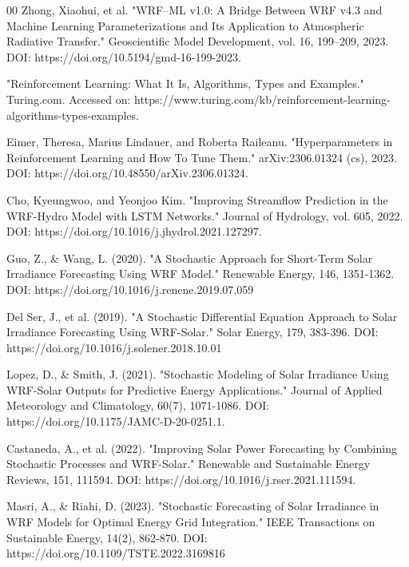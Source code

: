 \documentclass[conference]{IEEEtran}
\begin{document}
\begin{thebibliography}{00}
 Zhong, Xiaohui, et al. "WRF–ML v1.0: A Bridge Between WRF v4.3 and Machine Learning Parameterizations and Its Application to Atmospheric Radiative Transfer." Geoscientific Model Development, vol. 16, 199–209, 2023. DOI: https://doi.org/10.5194/gmd-16-199-2023.


 "Reinforcement Learning: What It Is, Algorithms, Types and Examples." Turing.com. Accessed on: https://www.turing.com/kb/reinforcement-learning-algorithms-types-examples.

 Eimer, Theresa, Marius Lindauer, and Roberta Raileanu. "Hyperparameters in Reinforcement Learning and How To Tune Them." arXiv:2306.01324 (cs), 2023. DOI: https://doi.org/10.48550/arXiv.2306.01324.

 Cho, Kyeungwoo, and Yeonjoo Kim. "Improving Streamflow Prediction in the WRF-Hydro Model with LSTM Networks." Journal of Hydrology, vol. 605, 2022. DOI: https://doi.org/10.1016/j.jhydrol.2021.127297.


 Guo, Z., \& Wang, L. (2020). "A Stochastic Approach for Short-Term Solar Irradiance Forecasting Using WRF Model." Renewable Energy, 146, 1351-1362. DOI: https://doi.org/10.1016/j.renene.2019.07.059

 Del Ser, J., et al. (2019). "A Stochastic Differential Equation Approach to Solar Irradiance Forecasting Using WRF-Solar." Solar Energy, 179, 383-396. DOI: https://doi.org/10.1016/j.solener.2018.10.01

 Lopez, D., \& Smith, J. (2021). "Stochastic Modeling of Solar Irradiance Using WRF-Solar Outputs for Predictive Energy Applications." Journal of Applied Meteorology and Climatology, 60(7), 1071-1086. DOI: https://doi.org/10.1175/JAMC-D-20-0251.1.

 Castaneda, A., et al. (2022). "Improving Solar Power Forecasting by Combining Stochastic Processes and WRF-Solar." Renewable and Sustainable Energy Reviews, 151, 111594. DOI: https://doi.org/10.1016/j.rser.2021.111594.

 Masri, A., \& Riahi, D. (2023). "Stochastic Forecasting of Solar Irradiance in WRF Models for Optimal Energy Grid Integration." IEEE Transactions on Sustainable Energy, 14(2), 862-870. DOI: https://doi.org/10.1109/TSTE.2022.3169816

\end{thebibliography}
\end{document}
